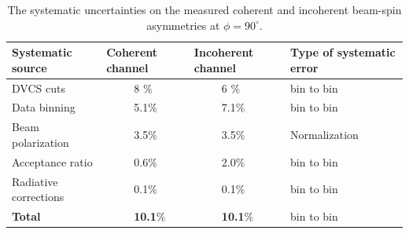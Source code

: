 \begin {table}[!h]
\begin{center}
\begin{tabular}{|l|l|l|l|}
\hline
Systematic source &  Coherent channel  & Incoherent channel &Type of systematic 
error\\
\hline
DVCS cuts & ~~~~~8 $\%$ &  ~~~~~6 $\%$ & bin to bin\\
\hline
Data binning & ~~~~~5.1$\%$ & ~~~~~7.1$\%$ &bin to bin\\
\hline
Beam polarization &  ~~~~~3.5$\%$ &  ~~~~~3.5$\%$& Normalization\\
\hline
Acceptance ratio &  ~~~~~0.6$\%$ &  ~~~~~2.0$\%$ &bin to bin\\
\hline
Radiative corrections &  ~~~~~0.1$\%$ & ~~~~~0.1$\%$ & bin to bin\\
\hline
\textbf{Total} &  ~~~~~\textbf{10.1}$\%$ &   ~~~~~\textbf{10.1}$\%$ &bin to 
bin\\
\hline
\end{tabular}
\caption{ The systematic uncertainties on the measured coherent and incoherent beam-spin asymmetries at $\phi = 90^{\circ}$.}
\label{Table:systematic_uncertainties}
\end{center}
\end{table}



